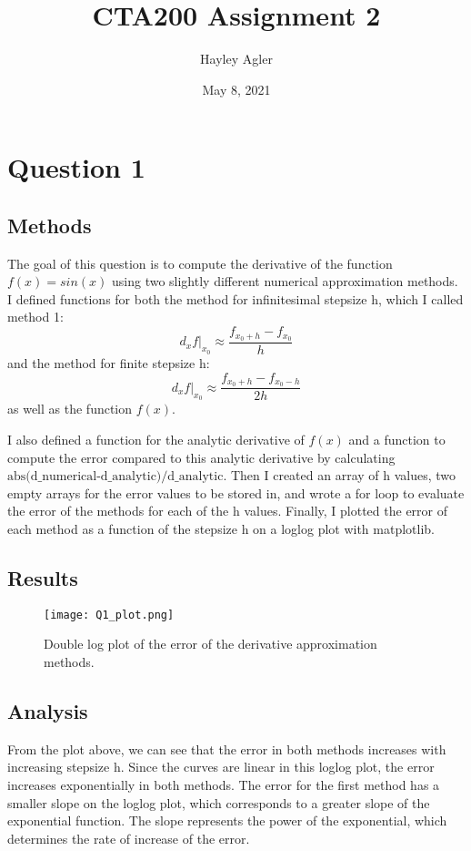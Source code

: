 \documentclass{article}
\title{CTA200 Assignment 2}
\author{Hayley Agler}
\date{May 8, 2021}
\begin{document}
\maketitle

\section*{Question 1}
\subsection*{Methods}
The goal of this question is to compute the derivative of the function $f(x)=sin(x)$ using two slightly different numerical approximation methods. I defined functions for both the method for infinitesimal stepsize h, which I called method 1: 
\begin{equation}
\left.d_{x} f\right|_{x_{0}} \approx \frac{f_{x_{0}+h}-f_{x_{0}}}{h}
\end{equation}
and the method for finite stepsize h:
\begin{equation}
\left.d_{x} f\right|_{x_{0}} \approx \frac{f_{x_{0}+h}-f_{x_{0}-h}}{2 h}
\end{equation}
as well as the function $f(x)$. 


I also defined a function for the analytic derivative of $f(x)$ and a function to compute the error compared to this analytic derivative by calculating $\textrm{abs(d\_numerical-d\_analytic)/d\_analytic}$. Then I created an array of h values, two empty arrays for the error values to be stored in, and wrote a for loop to evaluate the error of the methods for each of the h values. Finally, I plotted the error of each method as a function of the stepsize h on a loglog plot with matplotlib. 

\subsection*{Results}

\begin{figure}[H]
    \centering
    \texttt{[image: Q1\_plot.png]}
    \caption{Double log plot of the error of the derivative approximation methods.}
    \label{fig:my_label}
\end{figure}

\subsection*{Analysis}
From the plot above, we can see that the error in both methods increases with increasing stepsize h. Since the curves are linear in this loglog plot, the error increases exponentially in both methods. The error for the first method has a smaller slope on the loglog plot, which corresponds to a greater slope of the exponential function. The slope represents the power of the exponential, which determines the rate of increase of the error.
\end{document}

